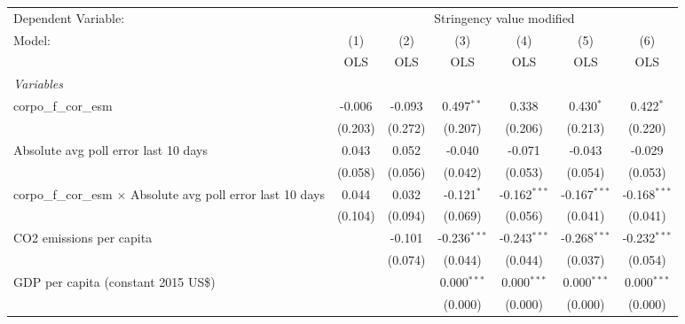 
\begingroup
\centering
\begin{tabular}{lcccccc}
   \toprule
   Dependent Variable: & \multicolumn{6}{c}{Stringency value modified}\\
   Model:                                                               & (1)     & (2)     & (3)            & (4)            & (5)            & (6)\\  
                                                                        &  OLS    & OLS     & OLS            & OLS            & OLS            & OLS\\  
   \midrule
   \emph{Variables}\\
   corpo\_f\_cor\_esm                                                   & -0.006  & -0.093  & 0.497$^{**}$   & 0.338          & 0.430$^{*}$    & 0.422$^{*}$\\   
                                                                        & (0.203) & (0.272) & (0.207)        & (0.206)        & (0.213)        & (0.220)\\   
   Absolute avg poll error last 10 days                                 & 0.043   & 0.052   & -0.040         & -0.071         & -0.043         & -0.029\\   
                                                                        & (0.058) & (0.056) & (0.042)        & (0.053)        & (0.054)        & (0.053)\\   
   corpo\_f\_cor\_esm $\times$ Absolute avg poll error last 10 days     & 0.044   & 0.032   & -0.121$^{*}$   & -0.162$^{***}$ & -0.167$^{***}$ & -0.168$^{***}$\\   
                                                                        & (0.104) & (0.094) & (0.069)        & (0.056)        & (0.041)        & (0.041)\\   
   CO2 emissions per capita                                             &         & -0.101  & -0.236$^{***}$ & -0.243$^{***}$ & -0.268$^{***}$ & -0.232$^{***}$\\   
                                                                        &         & (0.074) & (0.044)        & (0.044)        & (0.037)        & (0.054)\\   
   GDP per capita (constant 2015 US\$)                                  &         &         & 0.000$^{***}$  & 0.000$^{***}$  & 0.000$^{***}$  & 0.000$^{***}$\\   
                                                                        &         &         & (0.000)        & (0.000)        & (0.000)        & (0.000)\\   

\end{tabular}
